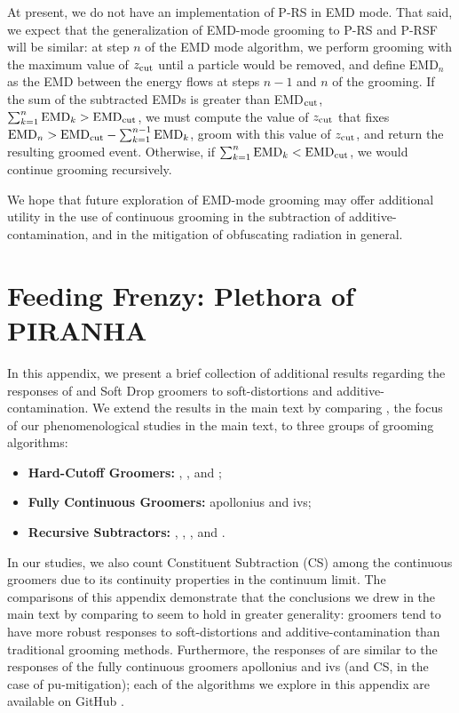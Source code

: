 \begin{subappendices}
At present, we do not have an implementation of P-RS in EMD mode.
%
That said, we expect that the generalization of EMD-mode grooming to P-RS and P-RSF will be similar:
%
at step \(n\) of the EMD mode algorithm, we perform grooming with the maximum value of \(z_{\rm cut}\) until a particle would be removed, and define EMD\(_n\) as the EMD between the energy flows at steps \(n-1\) and \(n\) of the grooming.
%
If the sum of the subtracted EMDs is greater than EMD\(_{\rm cut}\), \(\sum_{k = 1}^n {\rm EMD}_k > {\rm EMD}_{\rm cut}\),
%
we must compute the value of \(z_{\rm cut}\) that fixes \({\rm EMD}_n > {\rm EMD}_{\rm cut} - \sum_{k = 1}^{n-1} {\rm EMD}_k \), groom with this value of \(z_{\rm cut}\), and return the resulting groomed event.
%
Otherwise, if \(\sum_{k = 1}^n {\rm EMD}_k < {\rm EMD}_{\rm cut}\), we would continue grooming recursively.

We hope that future exploration of EMD-mode grooming may offer additional utility in the use of continuous grooming in the subtraction of \gls{additive-contamination}, and in the mitigation of obfuscating radiation in general.

\section[Feeding Frenzy: Plethora of \textsc{Piranha}]{Feeding Frenzy: Plethora of PIRANHA}
\label{app:feedingfrenzy}
In this appendix, we present a brief collection of additional results regarding the responses of \PIRANHA{} and Soft Drop groomers to \glspl{soft-distortion} and \gls{additive-contamination}.
%
We extend the results in the main text by comparing , the focus of our phenomenological studies in the main text, to three groups of grooming algorithms:
%
\begin{itemize}
    \item
    \textbf{Hard-Cutoff Groomers:}
    , , and ;

    \item
    \textbf{Fully Continuous Groomers:}
    \gls{apollonius} and \gls{ivs};

    \item
    \textbf{Recursive Subtractors:}
    , , , and .
\end{itemize}
In our  studies, we also count Constituent Subtraction (CS) \cite{Berta:2014eza} among the continuous groomers due to its continuity properties in the continuum limit.
%
The comparisons of this appendix demonstrate that the conclusions we drew in the main text by comparing  to  seem to hold in greater generality:
%
\PIRANHA{} groomers tend to have more robust responses to \glspl{soft-distortion} and \gls{additive-contamination} than traditional grooming methods.
%
Furthermore, the responses of  are similar to the responses of the fully continuous groomers \gls{apollonius} and \gls{ivs} (and CS, in the case of \gls{pu-mitigation});
%
each of the \PIRANHA{} algorithms we explore in this appendix are available on GitHub \cite{piranhagithub}.


\end{subappendices}
